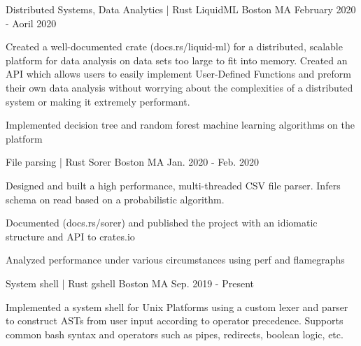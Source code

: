 

\begin{cventries}
    \cventry
    {Distributed Systems, Data Analytics | Rust} %
    {LiquidML} %
    {Boston MA} %
    {February 2020 - Aoril 2020} %
    {
      \begin{cvitems} %
        \item {Created a well-documented crate (docs.rs/liquid-ml) for a distributed,  scalable platform for data analysis on data sets too large to fit into memory. Created an API which allows users to easily implement User-Defined Functions and preform their own data analysis without worrying about the complexities of a distributed system or making it extremely performant.}
        \item {Implemented decision tree and random forest machine learning algorithms on the platform}
      \end{cvitems}
    }

    \cventry
    {File parsing | Rust} %
    {Sorer} %
    {Boston MA} %
    {Jan. 2020 - Feb. 2020} %
    {
      \begin{cvitems} %
        \item {Designed and built a high performance, multi-threaded CSV file parser. Infers schema on read based on a probabilistic algorithm.}
        \item {Documented (docs.rs/sorer) and published the project with an idiomatic structure and API to crates.io}
        \item {Analyzed performance under various circumstances using perf and flamegraphs}
      \end{cvitems}
    }

    \cventry
    {System shell | Rust} %
    {gshell} %
    {Boston MA} %
    {Sep. 2019 - Present} %
    {
      \begin{cvitems} %
        \item {Implemented a system shell for Unix Platforms using a custom lexer and parser to construct ASTs from user input according to operator precedence. Supports common bash syntax and operators such as pipes, redirects, boolean logic, etc.}
      \end{cvitems}
    }


\end{cventries}
